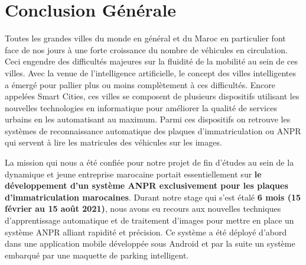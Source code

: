 \chapter*{Conclusion Générale}
Toutes les grandes villes du monde en général et du Maroc en particulier font face de nos jours à une forte croissance du nombre de véhicules en circulation. Ceci engendre des difficultés majeures sur la fluidité de la mobilité au sein de ces villes. Avec la venue de l’intelligence artificielle, le concept des villes intelligentes a émergé pour pallier plus ou moins complètement à ces difficultés. Encore appelées Smart Cities, ces villes se composent de plusieurs dispositifs utilisant les nouvelles technologies en informatique pour améliorer la qualité de services urbains en les automatisant au maximum. Parmi ces dispositifs on retrouve les systèmes de reconnaissance automatique des plaques d’immatriculation  ou ANPR qui servent à lire les matricules des véhicules sur les images. 


La mission qui nous a été confiée pour notre projet de fin d’études au sein de la dynamique et jeune entreprise marocaine portait essentiellement sur \textbf{le développement d’un système ANPR exclusivement pour les plaques d’immatriculation marocaines}. Durant notre stage qui s’est étalé \textbf{6 mois (15 février au 15 août 2021)}, nous avons eu recours aux nouvelles techniques d’apprentissage automatique et de traitement d’images  pour mettre en place un système ANPR alliant rapidité et précision. Ce système a été déployé d’abord dans une application mobile développée sous Android et par la suite un système embarqué par une maquette de parking intelligent.


